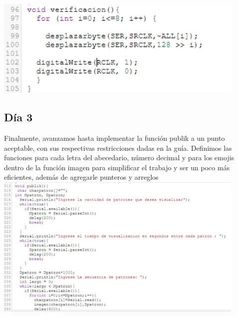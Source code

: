 \documentclass{article}
\begin{document}
\vspace{0.5cm}

\includegraphics[width=12cm]{Veri.jpeg}

\subsection{Día 3}
Finalmente, avanzamos hasta implementar la función publik a un punto aceptable, con sus respectivas restricciones dadas en la guía. Definimos las funciones para cada letra del abecedario, número decimal y para los emojis dentro de la función imagen para simplificar el trabajo y ser un poco más eficientes, además de agregarle punteros y arreglos\\

\includegraphics[width=12cm]{Dia 3.jpeg}

\label{fig:my_label}
\end{document}
